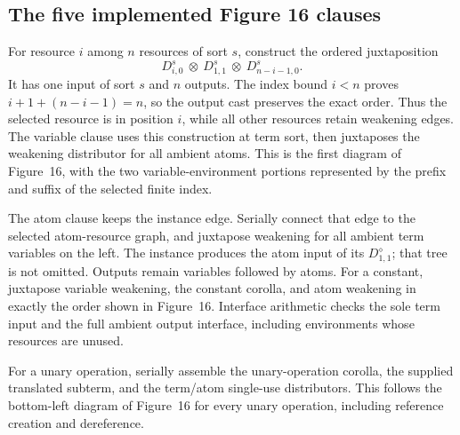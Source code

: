 

\subsection{The five implemented Figure 16 clauses}

For resource $i$ among $n$ resources of sort $s$, construct the ordered
juxtaposition
\[
 D^s_{i,0}\ \otimes\ D^s_{1,1}\ \otimes\ D^s_{n-i-1,0}.
\]
It has one input of sort $s$ and $n$ outputs. The index bound $i<n$ proves
$i+1+(n-i-1)=n$, so the output cast preserves the exact order. Thus the
selected resource is in position $i$, while all other resources retain
weakening edges. The variable clause uses this construction at term sort,
then juxtaposes the weakening distributor for all ambient atoms. This is
the first diagram of Figure~16, with the two variable-environment portions
represented by the prefix and suffix of the selected finite index.



The atom clause keeps the instance edge. Serially connect that edge to the
selected atom-resource graph, and juxtapose weakening for all ambient term
variables on the left. The instance produces the atom input of its
$D^{\diamond}_{1,1}$; that tree is not omitted. Outputs remain variables
followed by atoms. For a constant, juxtapose variable weakening, the constant
corolla, and atom weakening in exactly the order shown in Figure~16.
Interface arithmetic checks the sole term input and the full ambient output
interface, including environments whose resources are unused.



For a unary operation, serially assemble the unary-operation corolla,
the supplied translated subterm, and the term/atom single-use distributors.
This follows the bottom-left diagram of Figure~16 for every unary operation,
including reference creation and dereference.

